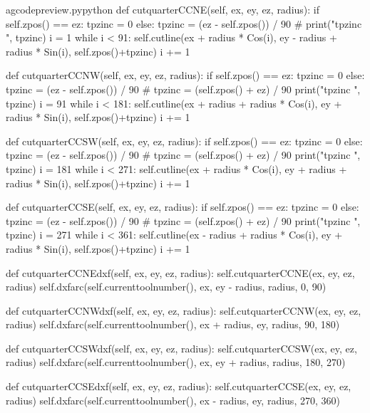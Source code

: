 \documentclass{ltxdoc}
\begin{document}
\lstset{firstnumber=\thegcpy}
\begin{writecode}{a}{gcodepreview.py}{python}
    def cutquarterCCNE(self, ex, ey, ez, radius):
        if self.zpos() == ez:
            tpzinc = 0
        else:
            tpzinc = (ez - self.zpos()) / 90
#        print("tpzinc ", tpzinc)
        i = 1
        while i < 91: 
            self.cutline(ex + radius * Cos(i), ey - radius + radius * Sin(i), self.zpos()+tpzinc)
            i += 1

    def cutquarterCCNW(self, ex, ey, ez, radius):
        if self.zpos() == ez:
            tpzinc = 0
        else:
            tpzinc = (ez - self.zpos()) / 90
#            tpzinc = (self.zpos() + ez) / 90
        print("tpzinc ", tpzinc)
        i = 91
        while i < 181: 
            self.cutline(ex + radius + radius * Cos(i), ey + radius * Sin(i), self.zpos()+tpzinc)
            i += 1

    def cutquarterCCSW(self, ex, ey, ez, radius):
        if self.zpos() == ez:
            tpzinc = 0
        else:
            tpzinc = (ez - self.zpos()) / 90
#            tpzinc = (self.zpos() + ez) / 90
        print("tpzinc ", tpzinc)
        i = 181
        while i < 271: 
            self.cutline(ex + radius * Cos(i), ey + radius + radius * Sin(i), self.zpos()+tpzinc)
            i += 1

    def cutquarterCCSE(self, ex, ey, ez, radius):
        if self.zpos() == ez:
            tpzinc = 0
        else:
            tpzinc = (ez - self.zpos()) / 90
#            tpzinc = (self.zpos() + ez) / 90
        print("tpzinc ", tpzinc)
        i = 271
        while i < 361: 
            self.cutline(ex - radius + radius * Cos(i), ey + radius * Sin(i), self.zpos()+tpzinc)
            i += 1

    def cutquarterCCNEdxf(self, ex, ey, ez, radius):
        self.cutquarterCCNE(ex, ey, ez, radius)
        self.dxfarc(self.currenttoolnumber(), ex, ey - radius, radius,  0, 90)

    def cutquarterCCNWdxf(self, ex, ey, ez, radius):
        self.cutquarterCCNW(ex, ey, ez, radius)
        self.dxfarc(self.currenttoolnumber(), ex + radius, ey, radius, 90, 180)

    def cutquarterCCSWdxf(self, ex, ey, ez, radius):
        self.cutquarterCCSW(ex, ey, ez, radius)
        self.dxfarc(self.currenttoolnumber(), ex, ey + radius, radius, 180, 270)

    def cutquarterCCSEdxf(self, ex, ey, ez, radius):
        self.cutquarterCCSE(ex, ey, ez, radius)
        self.dxfarc(self.currenttoolnumber(), ex - radius, ey, radius, 270, 360)

\end{writecode}
\addtocounter{gcpy}{49}
\end{document}
